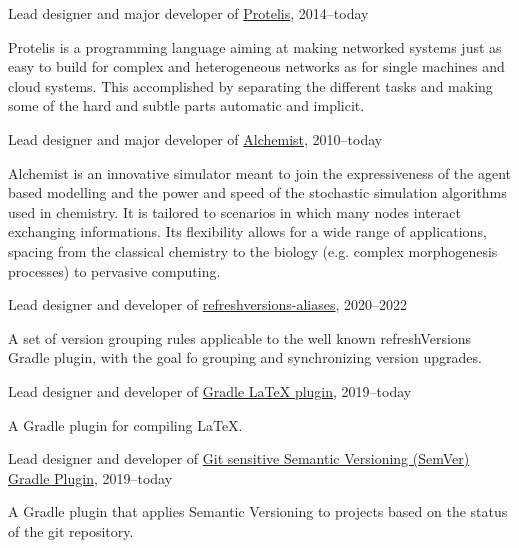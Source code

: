 \documentclass[10pt]{article}
\newenvironment{innerlist}[1][\enskip\textbullet]%
        {\begin{compactitem}[#1]}{\end{compactitem}}
\newcommand{\halfblankline}{\quad\vspace{-0.5\baselineskip}\pagebreak[3]}
\begin{document}
Lead designer and major developer of \href{http://protelis.org/}{Protelis}, 2014--today
\begin{innerlist}
    \item Protelis is a programming language aiming at making networked systems just as easy to build for complex and heterogeneous networks as for single machines and cloud systems. This accomplished by separating the different tasks and making some of the hard and subtle parts automatic and implicit.
\end{innerlist}
\halfblankline

Lead designer and major developer of \href{http://alchemistsimulator.github.io/}{Alchemist}, 2010--today
\begin{innerlist}
    \item Alchemist is an innovative simulator meant to join the expressiveness of the agent based modelling and the power and speed of the stochastic simulation algorithms used in chemistry. It is tailored to scenarios in which many nodes interact exchanging  informations. Its flexibility allows for a wide range of applications, spacing from the classical chemistry to the biology (e.g. complex morphogenesis processes) to pervasive computing.
\end{innerlist}
\halfblankline

Lead designer and developer of \href{https://github.com/DanySK/refreshversions-aliases}{refreshversions-aliases}, 2020--2022
\begin{innerlist}
    \item A set of version grouping rules applicable to the well known refreshVersions Gradle plugin,
    with the goal fo grouping and synchronizing version upgrades.
\end{innerlist}
\halfblankline

Lead designer and developer of \href{https://github.com/DanySK/gradle-latex}{Gradle LaTeX plugin}, 2019--today
\begin{innerlist}
    \item A Gradle plugin for compiling LaTeX.
\end{innerlist}
\halfblankline

Lead designer and developer of \href{https://github.com/DanySK/git-sensitive-semantic-versioning-gradle-plugin}{Git sensitive Semantic Versioning (SemVer) Gradle Plugin}, 2019--today
\begin{innerlist}
    \item A Gradle plugin that applies Semantic Versioning to projects based on the status of the git repository.
\end{innerlist}
\halfblankline
\end{document}
